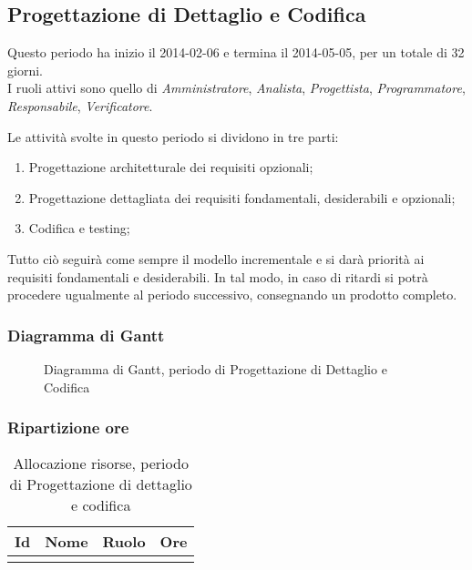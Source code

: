 	\subsection{Progettazione di Dettaglio e Codifica}
	 
Questo periodo ha inizio il 2014-02-06 e termina il 2014-05-05, per un totale di 32 giorni. \\
I ruoli attivi sono quello di \textit{Amministratore}, \textit{Analista}, \textit{Progettista}, \textit{Programmatore}, \textit{Responsabile}, \textit{Verificatore}.

Le attività svolte in questo periodo si dividono in tre parti:

\begin{enumerate}

	\item Progettazione architetturale dei requisiti opzionali;
	\item Progettazione dettagliata dei requisiti fondamentali, desiderabili e opzionali;
	\item Codifica e testing;

\end{enumerate}

Tutto ciò seguirà come sempre il modello incrementale e si darà priorità ai requisiti fondamentali e desiderabili.
In tal modo, in caso di ritardi si potrà procedere ugualmente al periodo successivo, consegnando un prodotto completo.

\subsubsection{Diagramma di Gantt}

\begin{figure}[H]
\centering
\scalebox{0.65}{%

	

}
\caption{Diagramma di Gantt, periodo di Progettazione di Dettaglio e Codifica}
\end{figure}

\subsubsection{Ripartizione ore}

\begin{center}
\begin{longtable}{ l l l c  }
	\hline
	\multicolumn{1}{c}{\textbf{Id}} & 
	\multicolumn{1}{c}{\textbf{Nome}} & 
	\multicolumn{1}{c}{\textbf{Ruolo}}& 
	\multicolumn{1}{c}{\textbf{Ore}} \\
	\hline
	
		
	
	\caption{Allocazione risorse, periodo di Progettazione di dettaglio e codifica}
\end{longtable}	
\end{center}
	
